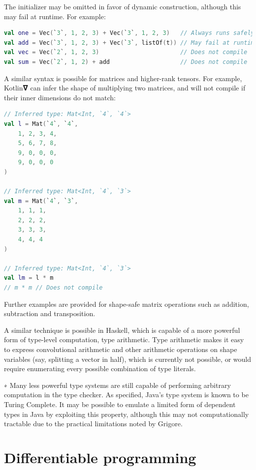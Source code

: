 \documentclass[12pt,initial,twoside,maitrise]{dms}
\numberwithin{equation}{section}
\numberwithin{table}{chapter}
\numberwithin{figure}{chapter}
\begin{document}
The initializer may be omitted in favor of dynamic construction, although this may fail at runtime. For example:

\begin{lstlisting}[caption={Simple code listing.}, language=Kotlin]
val one = Vec(`3`, 1, 2, 3) + Vec(`3`, 1, 2, 3)   // Always runs safely
val add = Vec(`3`, 1, 2, 3) + Vec(`3`, listOf(t)) // May fail at runtime
val vec = Vec(`2`, 1, 2, 3)                       // Does not compile
val sum = Vec(`2`, 1, 2) + add                    // Does not compile
\end{lstlisting}

A similar syntax is possible for matrices and higher-rank tensors. For example, Kotlin𝛁 can infer the shape of multiplying two matrices, and will not compile if their inner dimensions do not match:

\begin{lstlisting}[caption={Simple code listing.}, language=Kotlin]
// Inferred type: Mat<Int, `4`, `4`>
val l = Mat(`4`, `4`,
    1, 2, 3, 4,
    5, 6, 7, 8,
    9, 0, 0, 0,
    9, 0, 0, 0
)

// Inferred type: Mat<Int, `4`, `3`>
val m = Mat(`4`, `3`,
    1, 1, 1,
    2, 2, 2,
    3, 3, 3,
    4, 4, 4
)

// Inferred type: Mat<Int, `4`, `3`>
val lm = l * m
// m * m // Does not compile
\end{lstlisting}

Further examples are provided for shape-safe matrix operations such as addition, subtraction and transposition.

A similar technique is possible in Haskell, which is capable of a more powerful form of type-level computation, type arithmetic. Type arithmetic makes it easy to express convolutional arithmetic and other arithmetic operations on shape variables (say, splitting a vector in half), which is currently not possible, or would require enumerating every possible combination of type literals.

∗ Many less powerful type systems are still capable of performing arbitrary computation in the type checker. As specified, Java's type system is known to be Turing Complete. It may be possible to emulate a limited form of dependent types in Java by exploiting this property, although this may not computationally tractable due to the practical limitations noted by Grigore.

\section{Differentiable programming}\label{sec:differentiable-programming}
\end{document}
